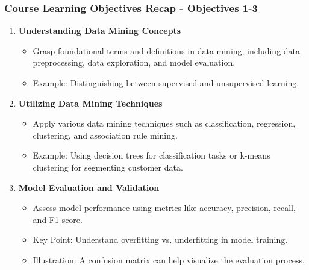 \documentclass[aspectratio=169]{beamer}
\begin{document}
\begin{frame}[fragile]
    \frametitle{Course Learning Objectives Recap - Objectives 1-3}
    \begin{enumerate}
        \item \textbf{Understanding Data Mining Concepts}
        \begin{itemize}
            \item Grasp foundational terms and definitions in data mining, including data preprocessing, data exploration, and model evaluation.
            \item Example: Distinguishing between supervised and unsupervised learning.
        \end{itemize}
        \item \textbf{Utilizing Data Mining Techniques}
        \begin{itemize}
            \item Apply various data mining techniques such as classification, regression, clustering, and association rule mining.
            \item Example: Using decision trees for classification tasks or k-means clustering for segmenting customer data.
        \end{itemize}
        \item \textbf{Model Evaluation and Validation}
        \begin{itemize}
            \item Assess model performance using metrics like accuracy, precision, recall, and F1-score.
            \item Key Point: Understand overfitting vs. underfitting in model training.
            \item Illustration: A confusion matrix can help visualize the evaluation process.
        \end{itemize}
    \end{enumerate}
\end{frame}
\end{document}
